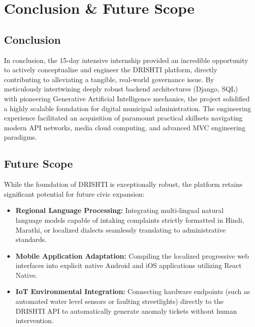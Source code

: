 \documentclass[12pt,a4paper]{report}
\begin{document}
\chapter{Conclusion \& Future Scope}

\section{Conclusion}
In conclusion, the 15-day intensive internship provided an incredible opportunity to actively conceptualize and engineer the DRISHTI platform, directly contributing to alleviating a tangible, real-world governance issue. By meticulously intertwining deeply robust backend architectures (Django, SQL) with pioneering Generative Artificial Intelligence mechanics, the project solidified a highly scalable foundation for digital municipal administration. The engineering experience facilitated an acquisition of paramount practical skillsets navigating modern API networks, media cloud computing, and advanced MVC engineering paradigms.

\section{Future Scope}
While the foundation of DRISHTI is exceptionally robust, the platform retains significant potential for future civic expansion:
\begin{itemize}
    \item \textbf{Regional Language Processing:} Integrating multi-lingual natural language models capable of intaking complaints strictly formatted in Hindi, Marathi, or localized dialects seamlessly translating to administrative standards.
    \item \textbf{Mobile Application Adaptation:} Compiling the localized progressive web interfaces into explicit native Android and iOS applications utilizing React Native.
    \item \textbf{IoT Environmental Integration:} Connecting hardware endpoints (such as automated water level sensors or faulting streetlights) directly to the DRISHTI API to automatically generate anomaly tickets without human intervention.
\end{itemize}

\end{document}
